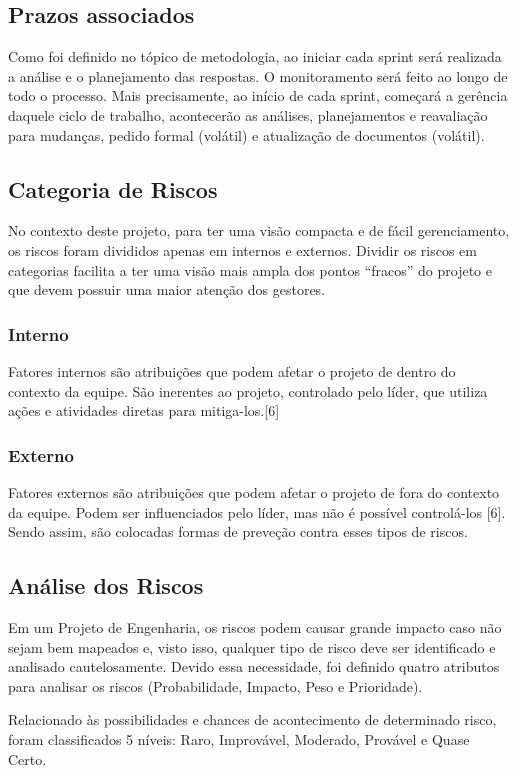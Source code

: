 \begin{apendicesenv}
\subsection{Prazos associados}
Como foi definido no tópico de metodologia, ao iniciar cada sprint será realizada a análise e o planejamento das respostas. O monitoramento será feito ao longo de todo o processo. Mais precisamente, ao início de cada sprint, começará a gerência daquele ciclo de trabalho, acontecerão as análises, planejamentos e reavaliação para mudanças, pedido formal (volátil) e atualização de documentos (volátil).

\subsection{Categoria de Riscos}
No contexto deste projeto, para ter uma visão compacta e de fácil gerenciamento, os riscos foram divididos apenas em internos e externos. Dividir os riscos em categorias facilita a ter uma visão mais ampla dos pontos “fracos” do projeto e que devem possuir uma maior atenção dos gestores.

\subsubsection{Interno}
Fatores internos são atribuições que podem afetar o projeto de dentro do contexto da equipe. São inerentes ao projeto, controlado pelo líder, que utiliza ações e atividades diretas para mitiga-los.[6]

\subsubsection{Externo}
Fatores externos são atribuições que podem afetar o projeto de fora do contexto da equipe. Podem ser influenciados pelo líder, mas não é possível controlá-los [6]. Sendo assim, são colocadas formas de preveção contra esses tipos de riscos.

\subsection{Análise dos Riscos}
Em um Projeto de Engenharia, os riscos podem causar grande impacto caso não sejam bem mapeados e, visto isso, qualquer tipo de risco deve ser identificado e analisado cautelosamente. Devido essa necessidade, foi definido quatro atributos para analisar os riscos (Probabilidade, Impacto, Peso e Prioridade).

Relacionado às possibilidades e chances de acontecimento de determinado risco, foram classificados 5 níveis: Raro, Improvável, Moderado, Provável e Quase Certo. 


\end{apendicesenv}
